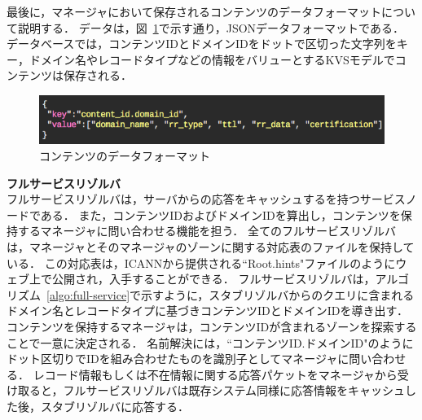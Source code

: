 \newpage
最後に，マネージャにおいて保存されるコンテンツのデータフォーマットについて説明する．
データは，図~\ref{fig:manager-provider}で示す通り，JSONデータフォーマットである．
データベースでは，コンテンツIDとドメインIDをドットで区切った文字列をキー，ドメイン名やレコードタイプなどの情報をバリューとするKVSモデルでコンテンツは保存される．
\begin{figure}[h]
 \centering
 \includegraphics[scale=0.6]{figure/content-file.png}
 \caption{コンテンツのデータフォーマット}
 \label{fig:manager-provider}
\end{figure}

\hspace{-12pt}\textbf{フルサービスリゾルバ}\\
\hspace{12pt}フルサービスリゾルバは，サーバからの応答をキャッシュするを持つサービスノードである．
また，コンテンツIDおよびドメインIDを算出し，コンテンツを保持するマネージャに問い合わせる機能を担う．
全てのフルサービスリゾルバは，マネージャとそのマネージャのゾーンに関する対応表のファイルを保持している．
この対応表は，ICANNから提供される``Root.hints"ファイルのようにウェブ上で公開され，入手することができる．
フルサービスリゾルバは，アルゴリズム~\ref{algo:full-service}で示すように，スタブリゾルバからのクエリに含まれるドメイン名とレコードタイプに基づきコンテンツIDとドメインIDを導き出す．
コンテンツを保持するマネージャは，コンテンツIDが含まれるゾーンを探索することで一意に決定される．
名前解決には，``コンテンツID.ドメインID"のようにドット区切りでIDを組み合わせたものを識別子としてマネージャに問い合わせる．
レコード情報もしくは不在情報に関する応答パケットをマネージャから受け取ると，フルサービスリゾルバは既存システム同様に応答情報をキャッシュした後，スタブリゾルバに応答する．



